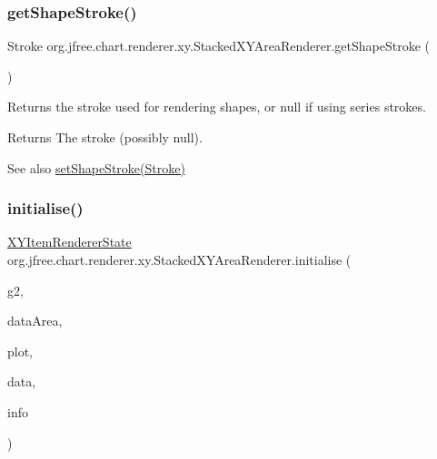 \subsubsection{\texorpdfstring{get\+Shape\+Stroke()}{getShapeStroke()}}
{\footnotesize\ttfamily Stroke org.\+jfree.\+chart.\+renderer.\+xy.\+Stacked\+X\+Y\+Area\+Renderer.\+get\+Shape\+Stroke (\begin{DoxyParamCaption}{ }\end{DoxyParamCaption})}

Returns the stroke used for rendering shapes, or {\ttfamily null} if using series strokes.

\begin{DoxyReturn}{Returns}
The stroke (possibly {\ttfamily null}).
\end{DoxyReturn}
\begin{DoxySeeAlso}{See also}
\mbox{\hyperlink{classorg_1_1jfree_1_1chart_1_1renderer_1_1xy_1_1_stacked_x_y_area_renderer_a8124f9930c21557b4132fc07ed7366db}{set\+Shape\+Stroke(\+Stroke)}} 
\end{DoxySeeAlso}
\mbox{\label{classorg_1_1jfree_1_1chart_1_1renderer_1_1xy_1_1_stacked_x_y_area_renderer_acae9be78da1b7cc21ccb2e8ac91f2c06}} 
\subsubsection{\texorpdfstring{initialise()}{initialise()}}
{\footnotesize\ttfamily \mbox{\hyperlink{classorg_1_1jfree_1_1chart_1_1renderer_1_1xy_1_1_x_y_item_renderer_state}{X\+Y\+Item\+Renderer\+State}} org.\+jfree.\+chart.\+renderer.\+xy.\+Stacked\+X\+Y\+Area\+Renderer.\+initialise (\begin{DoxyParamCaption}\item[{Graphics2D}]{g2,  }\item[{Rectangle2D}]{data\+Area,  }\item[{\mbox{\hyperlink{classorg_1_1jfree_1_1chart_1_1plot_1_1_x_y_plot}{X\+Y\+Plot}}}]{plot,  }\item[{\mbox{\hyperlink{interfaceorg_1_1jfree_1_1data_1_1xy_1_1_x_y_dataset}{X\+Y\+Dataset}}}]{data,  }\item[{\mbox{\hyperlink{classorg_1_1jfree_1_1chart_1_1plot_1_1_plot_rendering_info}{Plot\+Rendering\+Info}}}]{info }\end{DoxyParamCaption})}

